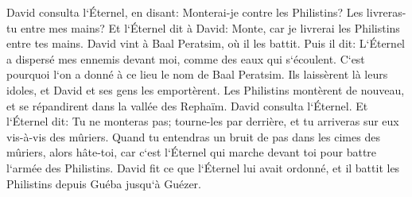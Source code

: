 \verse David consulta l`Éternel, en disant: Monterai-je contre les Philistins? Les livreras-tu entre mes mains? Et l`Éternel dit à David: Monte, car je livrerai les Philistins entre tes mains. 
\verse David vint à Baal Peratsim, où il les battit. Puis il dit: L`Éternel a dispersé mes ennemis devant moi, comme des eaux qui s`écoulent. C`est pourquoi l`on a donné à ce lieu le nom de Baal Peratsim. 
\verse Ils laissèrent là leurs idoles, et David et ses gens les emportèrent. 
\verse Les Philistins montèrent de nouveau, et se répandirent dans la vallée des Rephaïm. 
\verse David consulta l`Éternel. Et l`Éternel dit: Tu ne monteras pas; tourne-les par derrière, et tu arriveras sur eux vis-à-vis des mûriers. 
\verse Quand tu entendras un bruit de pas dans les cimes des mûriers, alors hâte-toi, car c`est l`Éternel qui marche devant toi pour battre l`armée des Philistins. 
\verse David fit ce que l`Éternel lui avait ordonné, et il battit les Philistins depuis Guéba jusqu`à Guézer. 

\chapter{}

